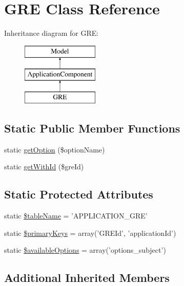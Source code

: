 \hypertarget{class_g_r_e}{\section{G\-R\-E Class Reference}
\label{class_g_r_e}
}
Inheritance diagram for G\-R\-E\-:\begin{figure}[H]
\begin{center}
\leavevmode
\includegraphics[height=3.000000cm]{class_g_r_e}
\end{center}
\end{figure}
\subsection*{Static Public Member Functions}
\begin{DoxyCompactItemize}
\item 
static \hyperlink{class_g_r_e_a8ba0e4d46b363116a5049e3cdfcb00f0}{get\-Option} (\$option\-Name)
\item 
static \hyperlink{class_g_r_e_a33b3548a1d99ca1d0caabfae314f3da7}{get\-With\-Id} (\$gre\-Id)
\end{DoxyCompactItemize}
\subsection*{Static Protected Attributes}
\begin{DoxyCompactItemize}
\item 
static \hyperlink{class_g_r_e_afd710fa5f2d6c8827c1c8d6ff40aa06c}{\$table\-Name} = 'A\-P\-P\-L\-I\-C\-A\-T\-I\-O\-N\-\_\-\-G\-R\-E'
\item 
static \hyperlink{class_g_r_e_a369e53315376c52b3f99114ff4476f7d}{\$primary\-Keys} = array('G\-R\-E\-Id', 'application\-Id')
\item 
static \hyperlink{class_g_r_e_a76504d793d3724efab43e9cb62559074}{\$available\-Options} = array('options\-\_\-subject')
\end{DoxyCompactItemize}
\subsection*{Additional Inherited Members}


